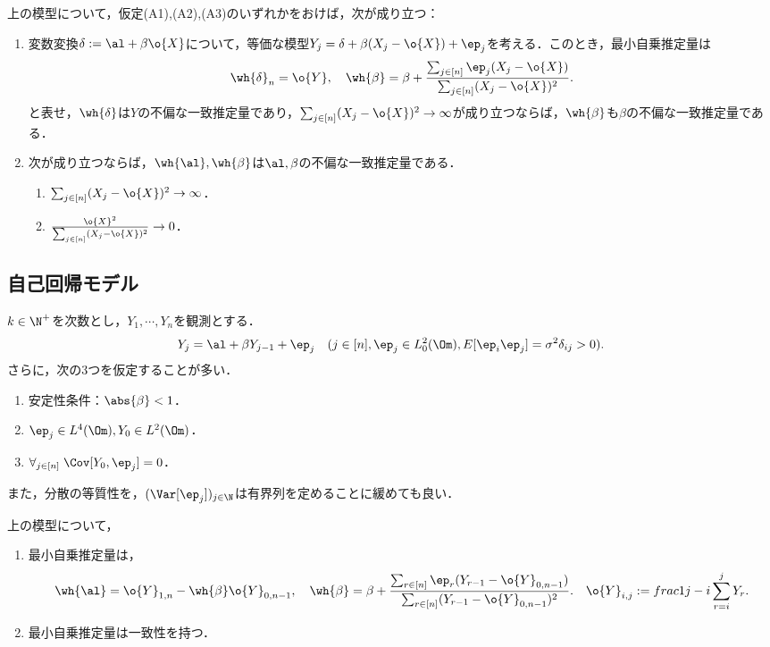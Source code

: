 \documentclass[uplatex,dvipdfmx]{jsreport}
\begin{document}
\begin{proposition}
    上の模型について，仮定(A1),(A2),(A3)のいずれかをおけば，次が成り立つ：
    \begin{enumerate}
        \item 変数変換$\delta:=\al+\beta\o{X}$について，等価な模型$Y_j=\delta+\beta(X_j-\o{X})+\ep_j$を考える．このとき，最小自乗推定量は
        \[\wh{\delta}_n=\o{Y},\quad\wh{\beta}=\beta+\frac{\sum_{j\in[n]}\ep_j(X_j-\o{X})}{\sum_{j\in[n]}(X_j-\o{X})^2}.\]
        と表せ，$\wh{\delta}$は$Y$の不偏な一致推定量であり，$\sum_{j\in[n]}(X_j-\o{X})^2\to\infty$が成り立つならば，$\wh{\beta}$も$\beta$の不偏な一致推定量である．
        \item 次が成り立つならば，$\wh{\al},\wh{\beta}$は$\al,\beta$の不偏な一致推定量である．
        \begin{enumerate}
            \item $\sum_{j\in[n]}(X_j-\o{X})^2\to\infty$．
            \item $\frac{\o{X}^2}{\sum_{j\in[n]}(X_j-\o{X})^2}\to0$．
        \end{enumerate}
    \end{enumerate}
\end{proposition}

\subsection{自己回帰モデル}

\begin{model}[線型自己回帰模型]
    $k\in\N^+$を次数とし，$Y_1,\cdots,Y_n$を観測とする．
    \[Y_j=\al+\beta Y_{j-1}+\ep_j\quad(j\in[n],\ep_j\in L^2_0(\Om),E[\ep_i\ep_j]=\sigma^2\delta_{ij}>0).\]
    さらに，次の3つを仮定することが多い．
    \begin{enumerate}[({A}1)]
        \item 安定性条件：$\abs{\beta}<1$．
        \item $\ep_j\in L^4(\Om),Y_0\in L^2(\Om)$．
        \item $\forall_{j\in[n]}\;\Cov[Y_0,\ep_j]=0$．
    \end{enumerate}
    また，分散の等質性を，$(\Var[\ep_j])_{j\in\N}$は有界列を定めることに緩めても良い．
\end{model}

\begin{proposition}
    上の模型について，
    \begin{enumerate}
        \item 最小自乗推定量は，
        \[\wh{\al}=\o{Y}_{1,n}-\wh{\beta}\o{Y}_{0,n-1},\quad\wh{\beta}=\beta+\frac{\sum_{r\in[n]}\ep_r(Y_{r-1}-\o{Y}_{0,n-1})}{\sum_{r\in[n]}(Y_{r-1}-\o{Y}_{0,n-1})^2}.\quad\o{Y}_{i,j}:=frac{1}{j-i}\sum_{r=i}^jY_r.\]
        \item 最小自乗推定量は一致性を持つ．
    \end{enumerate}
\end{proposition}
\end{document}
